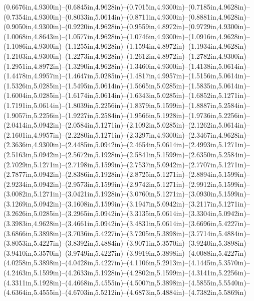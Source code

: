 (0.6676in,4.9300in)--(0.6845in,4.9628in)--(0.7015in,4.9300in)--(0.7185in,4.9628in)--(0.7354in,4.9300in)--(0.8033in,5.0614in)--(0.8711in,4.9300in)--(0.8881in,4.9628in)--(0.9050in,4.9300in)--(0.9220in,4.9628in)--(0.9559in,4.8972in)--(0.9729in,4.9300in)--(1.0068in,4.8643in)--(1.0577in,4.9628in)--(1.0746in,4.9300in)--(1.0916in,4.9628in)--(1.1086in,4.9300in)--(1.1255in,4.9628in)--(1.1594in,4.8972in)--(1.1934in,4.9628in)--(1.2103in,4.9300in)--(1.2273in,4.9628in)--(1.2612in,4.8972in)--(1.2782in,4.9300in)--(1.2951in,4.8972in)--(1.3290in,4.9628in)--(1.3460in,4.9300in)--(1.4138in,5.0614in)--(1.4478in,4.9957in)--(1.4647in,5.0285in)--(1.4817in,4.9957in)--(1.5156in,5.0614in)--(1.5326in,5.0285in)--(1.5495in,5.0614in)--(1.5665in,5.0285in)--(1.5835in,5.0614in)--(1.6004in,5.0285in)--(1.6174in,5.0614in)--(1.6343in,5.0285in)--(1.6852in,5.1271in)--(1.7191in,5.0614in)--(1.8039in,5.2256in)--(1.8379in,5.1599in)--(1.8887in,5.2584in)--(1.9057in,5.2256in)--(1.9227in,5.2584in)--(1.9566in,5.1928in)--(1.9736in,5.2256in)--(2.0414in,5.0942in)--(2.0584in,5.1271in)--(2.1092in,5.0285in)--(2.1262in,5.0614in)--(2.1601in,4.9957in)--(2.2280in,5.1271in)--(2.3297in,4.9300in)--(2.3467in,4.9628in)--(2.3636in,4.9300in)--(2.4485in,5.0942in)--(2.4654in,5.0614in)--(2.4993in,5.1271in)--(2.5163in,5.0942in)--(2.5672in,5.1928in)--(2.5841in,5.1599in)--(2.6350in,5.2584in)--(2.7029in,5.1271in)--(2.7198in,5.1599in)--(2.7537in,5.0942in)--(2.7707in,5.1271in)--(2.7877in,5.0942in)--(2.8386in,5.1928in)--(2.8725in,5.1271in)--(2.8894in,5.1599in)--(2.9234in,5.0942in)--(2.9573in,5.1599in)--(2.9742in,5.1271in)--(2.9912in,5.1599in)--(3.0082in,5.1271in)--(3.0421in,5.1928in)--(3.0760in,5.1271in)--(3.0930in,5.1599in)--(3.1269in,5.0942in)--(3.1608in,5.1599in)--(3.1947in,5.0942in)--(3.2117in,5.1271in)--(3.2626in,5.0285in)--(3.2965in,5.0942in)--(3.3135in,5.0614in)--(3.3304in,5.0942in)--(3.3983in,4.9628in)--(3.4661in,5.0942in)--(3.4831in,5.0614in)--(3.6696in,5.4227in)--(3.6866in,5.3898in)--(3.7036in,5.4227in)--(3.7205in,5.3898in)--(3.7714in,5.4884in)--(3.8053in,5.4227in)--(3.8392in,5.4884in)--(3.9071in,5.3570in)--(3.9240in,5.3898in)--(3.9410in,5.3570in)--(3.9749in,5.4227in)--(3.9919in,5.3898in)--(4.0088in,5.4227in)--(4.0258in,5.3898in)--(4.0428in,5.4227in)--(4.1106in,5.2913in)--(4.1445in,5.3570in)--(4.2463in,5.1599in)--(4.2633in,5.1928in)--(4.2802in,5.1599in)--(4.3141in,5.2256in)--(4.3311in,5.1928in)--(4.4668in,5.4555in)--(4.5007in,5.3898in)--(4.5855in,5.5540in)--(4.6364in,5.4555in)--(4.6703in,5.5212in)--(4.6873in,5.4884in)--(4.7382in,5.5869in) 